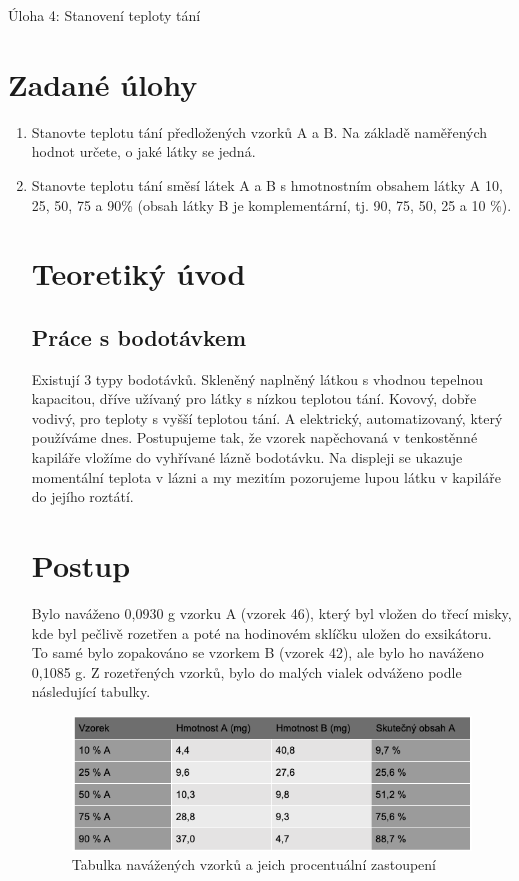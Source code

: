 \documentclass[13pt, a4paper, twoside]{article}
\begin{document}
\begin{center}
    \Huge
    Úloha 4: Stanovení teploty tání
\end{center}
\onehalfspacing \large
\section*{Zadané úlohy}
\begin{enumerate}
    \item Stanovte teplotu tání předložených vzorků A a B. Na základě naměřených hodnot určete,
    o jaké látky se jedná.
    \item    Stanovte teplotu tání směsí látek A a B s hmotnostním obsahem látky A 10, 25, 50, 75
    a 90\% (obsah látky B je komplementární, tj. 90, 75, 50, 25 a 10 \%).
     
\section*{Teoretiký úvod}
\subsection*{Práce s bodotávkem}
Existují 3 typy bodotávků. Skleněný naplněný látkou s vhodnou tepelnou kapacitou, dříve užívaný pro látky s nízkou teplotou tání. Kovový, dobře vodivý, pro teploty s vyšší teplotou tání. A elektrický, automatizovaný, který používáme dnes.
Postupujeme tak, že vzorek napěchovaná v tenkostěnné kapiláře vložíme do vyhřívané lázně bodotávku. Na displeji se ukazuje momentální teplota v lázni a my mezitím pozorujeme lupou látku v kapiláře do jejího roztátí.

\section*{Postup}
Bylo naváženo 0,0930 g vzorku A (vzorek 46), který byl vložen do třecí misky, kde byl pečlivě rozetřen a poté na hodinovém sklíčku uložen do exsikátoru. To samé bylo zopakováno se vzorkem B (vzorek 42), ale bylo ho naváženo 0,1085 g. Z rozetřených vzorků, bylo do malých vialek odváženo podle následující tabulky.
\begin{figure}[H]
    \centering
    \includegraphics[width=7in]{uloha_4_tab_1.png}
    \caption*{Tabulka navážených vzorků a jeich procentuální zastoupení}
\end{figure}


\end{enumerate}
\end{document}
